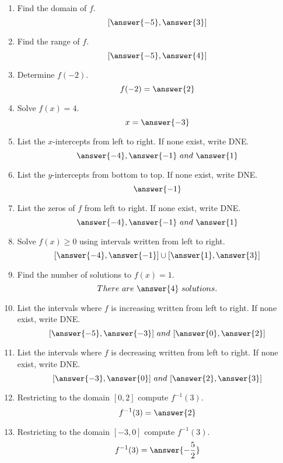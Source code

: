 \documentclass{ximera}
\begin{document}
\begin{exercise}
\begin{enumerate}
\item  Find the domain of $f$. \[[\answer{-5},\answer{3}]\] \label{usefuncgraphfirst}
\item  Find the range of $f$. \[[\answer{-5},\answer{4}]\]
\item  Determine $f(-2)$. \[f(-2)=\answer{2}\]
\item  Solve $f(x) = 4$. \[x=\answer{-3}\]
\item  List the $x$-intercepts from left to right. If none exist, write DNE. \[\answer{-4}, \answer{-1}\ and\ \answer{1}\]
\item  List the $y$-intercepts from bottom to top. If none exist, write DNE. \[\answer{-1}\]
\item  List the zeros of $f$ from left to right. If none exist, write DNE. \[\answer{-4}, \answer{-1}\ and\ \answer{1}\]
\item  Solve $f(x) \geq 0$ using intervals written from left to right. \[[\answer{-4},\answer{-1}]\cup[\answer{1},\answer{3}]\]
\item  Find the number of solutions to $f(x) = 1$. \[There\ are\ \answer{4}\ solutions.\]
\item  List the intervals where $f$ is increasing written from left to right. If none exist, write DNE. \[[\answer{-5},\answer{-3}]\ and\ [\answer{0},\answer{2}]\]
\item  List the intervals where $f$ is decreasing written from left to right. If none exist, write DNE. \[[\answer{-3},\answer{0}]\ and\ [\answer{2},\answer{3}]\]
\item  Restricting to the domain $[0,2]$ compute $f^{-1}(3)$. \[f^{-1}(3)=\answer{2}\]
\item  Restricting to the domain $[-3,0]$ compute $f^{-1}(3)$. \[f^{-1}(3)=\answer{-\frac{5}{2}}\]
\end{enumerate}

\end{exercise}
\end{document}
